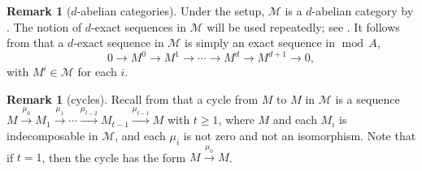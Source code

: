 \documentclass[12pt,reqno]{amsart}
\def\cM{\mathscr{M}}
\def\mod{\operatorname{mod}}
\numberwithin{equation}{section}
\theoremstyle{definition}
\newtheorem{Remark}[Lemma]{Remark}
\theoremstyle{theorem}
\theoremstyle{definition}
\begin{document}
\begin{Remark}
[$d$-abelian categories]
Under the setup, $\cM$ is a $d$-abelian category by \cite[thm.\ 3.16]{Jasso_n-abelian}.  The notion of $d$-exact sequences in $\cM$ will be used repeatedly; see \cite[def.\ 2.4]{Jasso_n-abelian}.  It follows from \cite[props.\ 2.2 and 2.6]{Jasso-Kvamme_Introduction-to_higher_AR-theory} that a $d$-exact sequence in $\cM$ is simply an exact sequence in $\mod\,A$,
\[
  0
  \xrightarrow{} M^0
  \xrightarrow{} M^1
  \xrightarrow{} \cdots
  \xrightarrow{} M^d
  \xrightarrow{} M^{ d+1 }
  \xrightarrow{} 0,
\]
with $M^i \in \cM$ for each $i$.
\end{Remark}


\begin{Remark}
[cycles]
\label{rmk:cycles}
Recall from \cite[p.\ 313]{Auslander-Reiten-Smalo_Representation-theory-of-Artin-algebras} that a cycle from $M$ to $M$ in $\cM$ is a sequence $M \xrightarrow{ \mu_0 } M_1 \xrightarrow{ \mu_1 } \cdots \xrightarrow{ \mu_{ t-2 } } M_{ t-1 } \xrightarrow{ \mu_{ t-1 } } M$ with $t \geqslant 1$, where $M$ and each $M_i$ is indecomposable in $\cM\!$, and each $\mu_i$ is not zero and not an isomorphism.  Note that if $t = 1$, then the cycle has the form $M \xrightarrow{ \mu_0 } M$.
\end{Remark}
\end{document}
